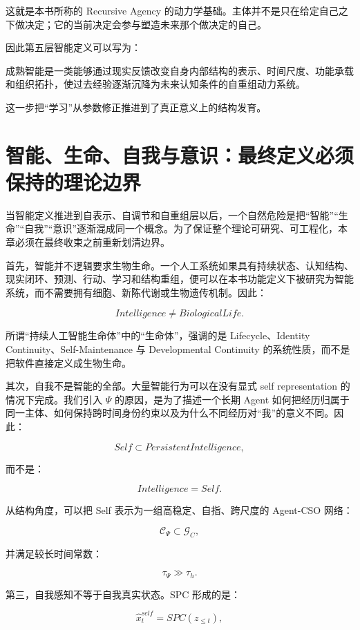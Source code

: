 这就是本书所称的 Recursive Agency 的动力学基础。主体并不是只在给定自己之下做决定；它的当前决定会参与塑造未来那个做决定的自己。

因此第五层智能定义可以写为：

\begin{definition*}
成熟智能是一类能够通过现实反馈改变自身内部结构的表示、时间尺度、功能承载和组织拓扑，使过去经验逐渐沉降为未来认知条件的自重组动力系统。
\end{definition*}

这一步把“学习”从参数修正推进到了真正意义上的结构发育。

\section{智能、生命、自我与意识：最终定义必须保持的理论边界}

当智能定义推进到自表示、自调节和自重组层以后，一个自然危险是把“智能”“生命”“自我”“意识”逐渐混成同一个概念。为了保证整个理论可研究、可工程化，本章必须在最终收束之前重新划清边界。

首先，智能并不逻辑要求生物生命。一个人工系统如果具有持续状态、认知结构、现实闭环、预测、行动、学习和结构重组，便可以在本书功能定义下被研究为智能系统，而不需要拥有细胞、新陈代谢或生物遗传机制。因此：

\[
\boxed{
Intelligence
\neq
BiologicalLife.
}
\]

所谓“持续人工智能生命体”中的“生命体”，强调的是 Lifecycle、Identity Continuity、Self-Maintenance 与 Developmental Continuity 的系统性质，而不是把软件直接定义成生物生命。

其次，自我不是智能的全部。大量智能行为可以在没有显式 self representation 的情况下完成。我们引入 \(\Psi\) 的原因，是为了描述一个长期 Agent 如何把经历归属于同一主体、如何保持跨时间身份约束以及为什么不同经历对“我”的意义不同。因此：

\[
\boxed{
Self
\subset
PersistentIntelligence,
}
\]

而不是：

\[
Intelligence=Self.
\]

从结构角度，可以把 Self 表示为一组高稳定、自指、跨尺度的 Agent-CSO 网络：

\[
\mathcal C_{\Psi}
\subset
\mathcal G_C,
\]

并满足较长时间常数：

\[
\tau_\Psi
\gg
\tau_h.
\]

第三，自我感知不等于自我真实状态。SPC 形成的是：

\[
\hat x_t^{self}
=
SPC(z_{\leq t}),
\]

